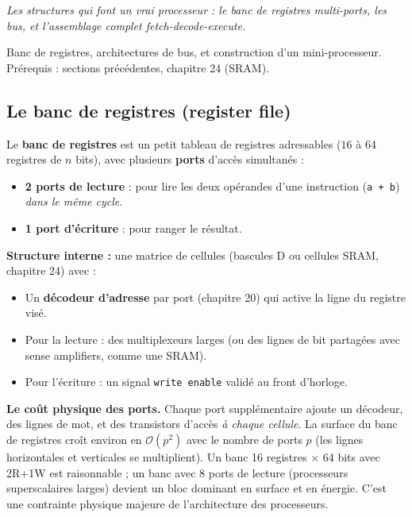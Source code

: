 \documentclass[12pt,a4paper,twoside]{book}
\begin{document}
\vspace{0.3cm}
\textit{Les structures qui font un vrai processeur : le banc de registres multi-ports, les bus, et l'assemblage complet fetch-decode-execute.}
\vspace{0.3cm}

\begin{approfondissement}
Banc de registres, architectures de bus, et construction d'un mini-processeur. Prérequis : sections précédentes, chapitre 24 (SRAM).
\end{approfondissement}

\subsection{Le banc de registres (register file)}

\begin{formule}
Le \textbf{banc de registres} est un petit tableau de registres adressables ($16$ à $64$ registres de $n$ bits), avec plusieurs \textbf{ports} d'accès simultanés :

\begin{itemize}[nosep]
\item \textbf{2 ports de lecture} : pour lire les deux opérandes d'une instruction (\texttt{a + b}) \textit{dans le même cycle}.
\item \textbf{1 port d'écriture} : pour ranger le résultat.
\end{itemize}

\textbf{Structure interne :} une matrice de cellules (bascules D ou cellules SRAM, chapitre 24) avec :
\begin{itemize}[nosep]
\item Un \textbf{décodeur d'adresse} par port (chapitre 20) qui active la ligne du registre visé.
\item Pour la lecture : des multiplexeurs larges (ou des lignes de bit partagées avec sense amplifiers, comme une SRAM).
\item Pour l'écriture : un signal \texttt{write enable} validé au front d'horloge.
\end{itemize}
\end{formule}

\begin{attention}
\textbf{Le coût physique des ports.} Chaque port supplémentaire ajoute un décodeur, des lignes de mot, et des transistors d'accès \textit{à chaque cellule}. La surface du banc de registres croît environ en $\mathcal{O}(p^2)$ avec le nombre de ports $p$ (les lignes horizontales et verticales se multiplient). Un banc 16 registres $\times$ 64 bits avec 2R+1W est raisonnable ; un banc avec 8 ports de lecture (processeurs superscalaires larges) devient un bloc dominant en surface et en énergie. C'est une contrainte physique majeure de l'architecture des processeurs.
\end{attention}
\end{document}

